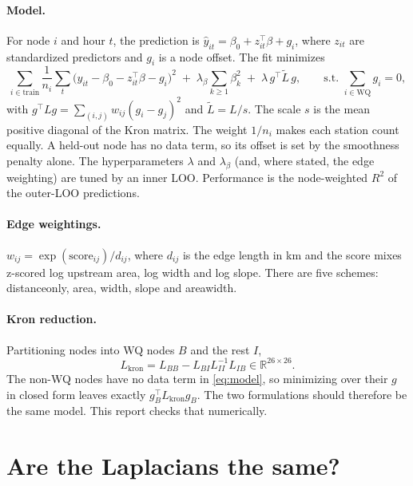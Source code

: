 \documentclass[11pt]{article}
\newcommand{\codeus}{\textunderscore\allowbreak}
\newcommand{\code}[1]{{\ttfamily\let\_\codeus #1}}
\begin{document}
\paragraph{Model.} For node $i$ and hour $t$, the prediction is
$\hat y_{it} = \beta_0 + z_{it}^\top\beta + g_i$, where $z_{it}$ are standardized predictors and
$g_i$ is a node offset. The fit minimizes
\begin{equation}
  \sum_{i\in\text{train}} \frac{1}{n_i}\sum_t \bigl(y_{it}-\beta_0-z_{it}^\top\beta-g_i\bigr)^2
  \;+\; \lambda_\beta \sum_{k\ge 1}\beta_k^2 \;+\; \lambda\, g^\top \tilde L\, g,
  \qquad \text{s.t. } \textstyle\sum_{i\in \mathrm{WQ}} g_i = 0 ,
  \label{eq:model}
\end{equation}
with $g^\top L g = \sum_{(i,j)} w_{ij}(g_i-g_j)^2$ and $\tilde L = L/s$. The scale $s$ is the mean
positive diagonal of the Kron matrix. The weight $1/n_i$ makes each station count equally.
A held-out node has no data term, so its offset is set by the smoothness penalty alone.
The hyperparameters $\lambda$ and $\lambda_\beta$ (and, where stated, the edge weighting) are tuned
by an inner LOO. Performance is the node-weighted $R^2$ of the outer-LOO predictions.

\paragraph{Edge weightings.} $w_{ij} = \exp(\text{score}_{ij})/d_{ij}$, where
$d_{ij}$ is the edge length in km and the score mixes z-scored log upstream area, log width and
log slope. There are five schemes: \code{distance\_only}, \code{area}, \code{width},
\code{slope} and \code{area\_width}.

\paragraph{Kron reduction.} Partitioning nodes into WQ nodes $B$ and the rest $I$,
\begin{equation}
  L_{\mathrm{kron}} = L_{BB} - L_{BI} L_{II}^{-1} L_{IB} \in \mathbb{R}^{26\times 26}.
\end{equation}
The non-WQ nodes have no data term in \eqref{eq:model}, so minimizing over their $g$ in closed form
leaves exactly $g_B^\top L_{\mathrm{kron}} g_B$. The two formulations should therefore be the same
model. This report checks that numerically.

\section{Are the Laplacians the same?}
\end{document}

